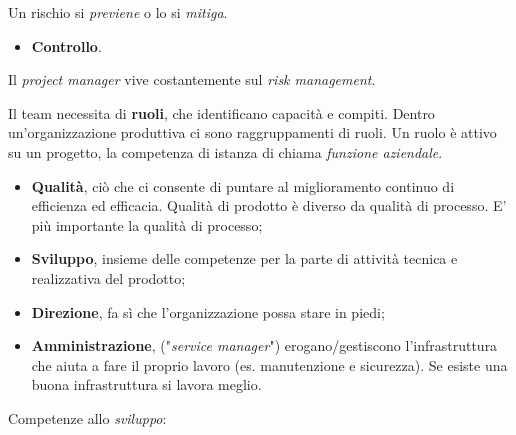 Un rischio si \textit{previene} o lo si \textit{mitiga}.

\begin{itemize}

	\item \textbf{Controllo}.

\end{itemize}

Il \textit{project manager} vive costantemente sul \textit{risk management}.

Il team necessita di \textbf{ruoli}, che identificano capacità e compiti. Dentro un'organizzazione produttiva ci sono raggruppamenti di ruoli. Un ruolo è attivo su un progetto, la competenza di istanza di chiama \textit{funzione aziendale}.

\begin{itemize}

	\item \textbf{Qualità}, ciò che ci consente di puntare al miglioramento continuo di efficienza ed efficacia. Qualità di prodotto è diverso da qualità di processo. E' più importante la qualità di processo;
	
	\item \textbf{Sviluppo}, insieme delle competenze per la parte di attività tecnica e realizzativa del prodotto;
	
	\item \textbf{Direzione}, fa sì che l'organizzazione possa stare in piedi;
	
	\item \textbf{Amministrazione}, ("\textit{service manager}") erogano/gestiscono l'infrastruttura che aiuta a fare il proprio lavoro (es. manutenzione e sicurezza). Se esiste una buona infrastruttura si lavora meglio.

\end{itemize}

Competenze allo \textit{sviluppo}:

